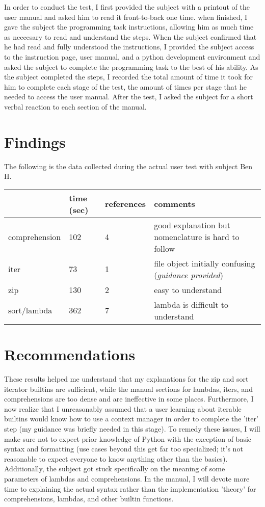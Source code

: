 \documentclass[11pt]{article}
\begin{document}
In order to conduct the test, I first provided the subject with a printout of the user manual and asked him to read it front-to-back one time. when finished, I gave the subject the programming task instructions, allowing him as much time as neccesary to read and understand the steps. When the subject confirmed that he had read and fully understood the instructions, I provided the subject access to the instruction page, user manual, and a python development environment and asked the subject to complete the programming task to the best of his ability. As the subject completed the steps, I recorded the total amount of time it took for him to complete each stage of the test, the amount of times per stage that he needed to access the user manual. After the test, I asked the subject for a short verbal reaction to each section of the manual.

\section{Findings}

The following is the data collected during the actual user test with subject Ben H.

\vspace{.5em}
\noindent
\begin{tabular}{l | l l l }
	              & time (sec) & references & comments \\\hline
	comprehension & 102        & 4          & good explanation but nomenclature is hard to follow \\
	iter          & 73         & 1          & file object initially confusing (\textit{guidance provided})\\
	zip           & 130        & 2          & easy to understand \\
	sort/lambda   & 362        & 7          & lambda is difficult to understand \\

\end{tabular}

\newpage
\section{Recommendations}

These results helped me understand that my explanations for the zip and sort iterator builtins are sufficient, while the manual sections for lambdas, iters, and comprehensions are too dense and are ineffective in some places. Furthermore, I now realize that I unreasonably assumed that a user learning about iterable builtins would know how to use a context manager in order to complete the 'iter' step (my guidance was briefly needed in this stage). To remedy these issues, I will make sure not to expect prior knowledge of Python with the exception of basic syntax and formatting (use cases beyond this get far too specialized; it's not reasonable to expect everyone to know anything other than the basics). Additionally, the subject got stuck specifically on the meaning of some parameters of lambdas and comprehensions. In the manual, I will devote more time to explaining the actual syntax rather than the implementation 'theory' for comprehensions, lambdas, and other builtin functions.

\printbibliography
\end{document}
